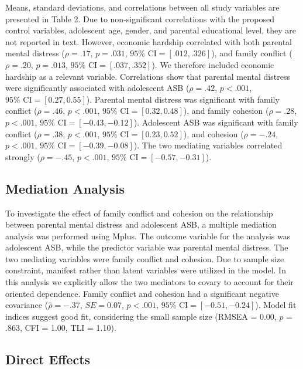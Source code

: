 \documentclass{sn-jnl}                  %
\begin{document}
Means, standard deviations, and correlations between all study variables are presented in Table 2. Due to non-significant correlations with the proposed control variables, adolescent age, gender, and parental educational level, they are not reported in text. However, economic hardship correlated with both parental mental distress ($\rho = .17$, $p = .031$, $95\% \text{ CI} = [.012, .326]$), and family conflict ($\rho = .20$, $p = .013$, $95\% \text{ CI} = [.037, .352]$). We therefore included economic hardship as a relevant variable. Correlations show that parental mental distress were significantly associated with adolescent ASB ($\rho = .42$, $p < .001$, $95\% \text{ CI} = [0.27, 0.55]$). Parental mental distress was significant with family conflict ($\rho = .46$, $p < .001$, $95\% \text{ CI} = [0.32, 0.48]$), and family cohesion ($\rho = .28$, $p < .001$, $95\% \text{ CI} = [-0.43, -0.12]$). Adolescent ASB was significant with family conflict ($\rho = .38$, $p < .001$, $95\% \text{ CI} = [0.23, 0.52]$), and cohesion ($\rho = -.24$, $p < .001$, $95\% \text{ CI} = [-0.39, -0.08]$). The two mediating variables correlated strongly ($\rho = -.45$, $p < .001$, $95\% \text{ CI} = [-0.57, -0.31]$).

\subsection{Mediation Analysis}

To investigate the effect of family conflict and cohesion on the relationship between parental mental distress and adolescent ASB, a multiple mediation analysis was performed using \textsf{Mplus}. The outcome variable for the analysis was adolescent ASB, while the predictor variable was parental mental distress. The two mediating variables were family conflict and cohesion. Due to sample size constraint, manifest rather than latent variables were utilized in the model. In this analysis we explicitly allow the two mediators to covary to account for their oriented dependence. Family conflict and cohesion had a significant negative covariance ($\hat{\rho} = -.37$, $SE = 0.07$, $p < .001$, $95\% \text{ CI} = [-0.51, -0.24]$). Model fit indices suggest good fit, considering the small sample size (RMSEA = 0.00, $p$ = .863, CFI = 1.00, TLI = 1.10).

\subsection{Direct Effects}
\end{document}
